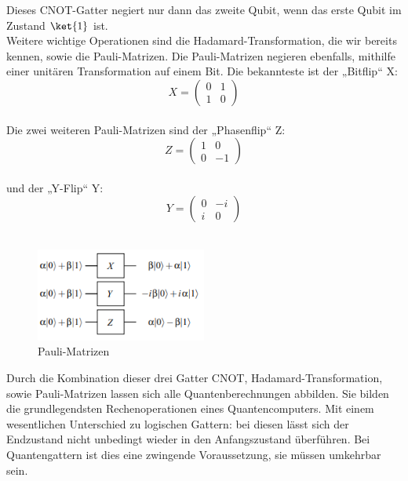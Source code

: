 Dieses CNOT-Gatter negiert nur dann das zweite Qubit, wenn das erste Qubit im Zustand $\ket{1}$ ist.\\

Weitere wichtige Operationen sind die Hadamard-Transformation, die wir bereits kennen, sowie die Pauli-Matrizen.
Die Pauli-Matrizen negieren ebenfalls, mithilfe einer unitären Transformation auf einem Bit.
Die bekannteste ist der „Bitflip“ X:\\
\begin{equation}
    X =
    \begin{pmatrix}
        0 & 1 \\
        1 & 0
    \end{pmatrix}
\end{equation}\\

Die zwei weiteren Pauli-Matrizen sind der „Phasenflip“ Z:\\
\begin{equation}
    Z =
    \begin{pmatrix}
        1 & 0 \\
        0 & -1
    \end{pmatrix}
\end{equation}\\

und der „Y-Flip“ Y:\\
\begin{equation}
    Y =
    \begin{pmatrix}
        0 & -i \\
        i & 0
    \end{pmatrix}
\end{equation}\\

\begin{figure}[H]
    \centering
    \includegraphics[width=0.5\textwidth]{img/Quantengatter Pauli_Matrizen}
    \caption{Pauli-Matrizen}
    \label{fig:pauli-matrizen}
\end{figure}

Durch die Kombination dieser drei Gatter CNOT, Hadamard-Transformation, sowie Pauli-Matrizen lassen sich alle Quantenberechnungen abbilden.
Sie bilden die grundlegendsten Rechenoperationen eines Quantencomputers.
Mit einem wesentlichen Unterschied zu logischen Gattern: bei diesen lässt sich der Endzustand nicht unbedingt wieder in den Anfangszustand überführen.
Bei Quantengattern ist dies eine zwingende Voraussetzung, sie müssen umkehrbar sein.\\


